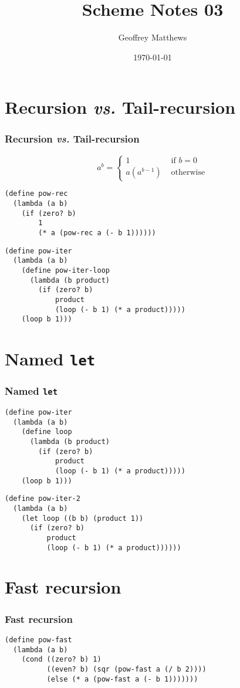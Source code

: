 \documentclass{beamer}
\title
{
Scheme Notes 03
}
\subtitle{
} %
\author[Geoffrey Matthews]
{Geoffrey Matthews}
\institute[WWU/CS]
{
  Department of Computer Science\\
  Western Washington University
}
\date{\today}
\newcommand{\sect}[1]{
\section{#1}
\begin{frame}[fragile]\frametitle{#1}
}
\begin{document}
\begin{frame}
  \titlepage
\end{frame}


\newcommand{\myref}[1]{\small\item\url{#1}}
\newcommand{\myreft}[1]{\footnotesize\item\url{#1}}


\sect{Recursion {\em vs.} Tail-recursion}

\[ a^b = \left\{\begin{array}{ll} 1 & \mbox{ if $b=0$}\\
    a(a^{b-1}) & \mbox{ otherwise}
  \end{array}\right.
  \]

\begin{Verbatim}
(define pow-rec
  (lambda (a b)
    (if (zero? b) 
        1
        (* a (pow-rec a (- b 1))))))
\end{Verbatim}
\vfill\pause

\begin{Verbatim}
(define pow-iter
  (lambda (a b)
    (define pow-iter-loop
      (lambda (b product)
        (if (zero? b)
            product
            (loop (- b 1) (* a product)))))
    (loop b 1)))
\end{Verbatim}
\end{frame}

\sect{Named {\tt let}}

\begin{Verbatim}
(define pow-iter
  (lambda (a b)
    (define loop
      (lambda (b product)
        (if (zero? b)
            product
            (loop (- b 1) (* a product)))))
    (loop b 1)))
\end{Verbatim}
\vfill
\begin{Verbatim}
(define pow-iter-2
  (lambda (a b)
    (let loop ((b b) (product 1))
      (if (zero? b)
          product
          (loop (- b 1) (* a product))))))
\end{Verbatim}
\end{frame}

\sect{Fast recursion}
\begin{Verbatim}
(define pow-fast
  (lambda (a b)
    (cond ((zero? b) 1)
          ((even? b) (sqr (pow-fast a (/ b 2))))
          (else (* a (pow-fast a (- b 1)))))))
\end{Verbatim}
\end{frame}
\end{document}

